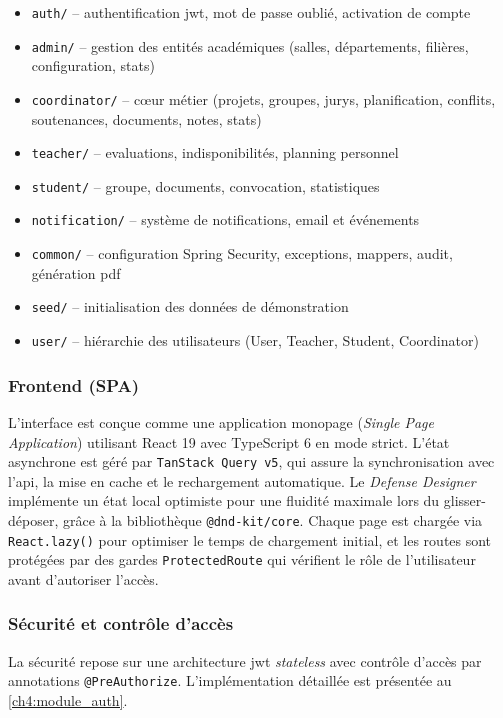 \begin{itemize}[label=\textcolor{primary}{\textbullet}]
    \item \texttt{auth/} -- authentification \acrshort{jwt}, mot de passe oublié, activation de compte
    \item \texttt{admin/} -- gestion des entités académiques (salles, départements, filières, configuration, stats)
    \item \texttt{coordinator/} -- cœur métier (projets, groupes, jurys, planification, conflits, soutenances, documents, notes, stats)
    \item \texttt{teacher/} -- evaluations, indisponibilités, planning personnel
    \item \texttt{student/} -- groupe, documents, convocation, statistiques
    \item \texttt{notification/} -- système de notifications, email et événements
    \item \texttt{common/} -- configuration Spring Security, exceptions, mappers, audit, génération \acrshort{pdf}
    \item \texttt{seed/} -- initialisation des données de démonstration
    \item \texttt{user/} -- hiérarchie des utilisateurs (User, Teacher, Student, Coordinator)
\end{itemize}

\subsubsection{Frontend (SPA)}
L'interface est conçue comme une application monopage (\textit{Single Page Application}) utilisant React 19 avec TypeScript 6 en mode strict. L'état asynchrone est géré par \texttt{TanStack Query v5}, qui assure la synchronisation avec l'\acrshort{api}, la mise en cache et le rechargement automatique. Le \textit{Defense Designer} implémente un état local optimiste pour une fluidité maximale lors du glisser-déposer, grâce à la bibliothèque \texttt{@dnd-kit/core}. Chaque page est chargée via \texttt{React.lazy()} pour optimiser le temps de chargement initial, et les routes sont protégées par des gardes \texttt{ProtectedRoute} qui vérifient le rôle de l'utilisateur avant d'autoriser l'accès.

\subsubsection{Sécurité et contrôle d'accès}
La sécurité repose sur une architecture \acrshort{jwt} \textit{stateless} avec contrôle d'accès par annotations \texttt{@PreAuthorize}. L'implémentation détaillée est présentée au \cref{ch4:module_auth}.

